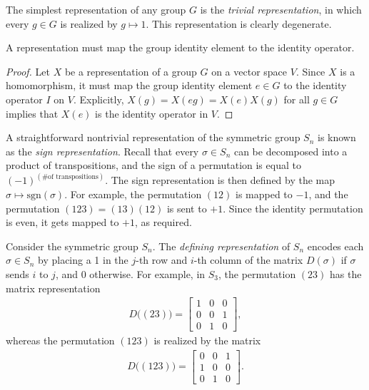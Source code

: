 \begin{example}
    The simplest representation of any group $G$ is the \textit{trivial representation}, in which every $g\in G$ is realized by $g\mapsto 1$. This representation is clearly degenerate.
\end{example}

\begin{remark}
    A representation must map the group identity element to the identity operator.
\end{remark}
\begin{proof}
    Let $X$ be a representation of a group $G$ on a vector space $V$. Since $X$ is a homomorphism, it must map the group identity element $e\in G$ to the identity operator $I$ on $V$. Explicitly, $X(g) = X(eg) = X(e)X(g)$ for all $g\in G$ implies that $X(e)$ is the identity operator in $V$.
\end{proof}

\begin{example}
    A straightforward nontrivial representation of the symmetric group $S_n$ is known as the \textit{sign representation}. Recall that every $\sigma\in S_n$ can be decomposed into a product of transpositions, and the sign of a permutation is equal to ${(-1)}^{(\textrm{\# of transpositions})}$. The sign representation is then defined by the map $\sigma\mapsto\textrm{sgn}(\sigma)$. For example, the permutation $(12)$ is mapped to $-1$, and the permutation $(123) = (13)(12)$ is sent to $+1$. Since the identity permutation is even, it gets mapped to $+1$, as required.
\end{example}

\begin{example}
    Consider the symmetric group $S_n$. The \textit{defining representation} of $S_n$ encodes each $\sigma\in S_n$ by placing a 1 in the $j$-th row and $i$-th column of the matrix $D(\sigma)$ if $\sigma$ sends $i$ to $j$, and 0 otherwise. For example, in $S_3$, the permutation $(23)$ has the matrix representation
    \begin{align}
        D\big((23)\big) = \begin{bmatrix} 1 & 0 & 0 \\ 0 & 0 & 1 \\ 0 & 1 & 0 \end{bmatrix},
    \end{align}
    whereas the permutation $(123)$ is realized by the matrix
    \begin{align}
        D\big((123)\big) = \begin{bmatrix} 0 & 0 & 1 \\ 1 & 0 & 0 \\ 0 & 1 & 0 \end{bmatrix}.
    \end{align}
\end{example}

